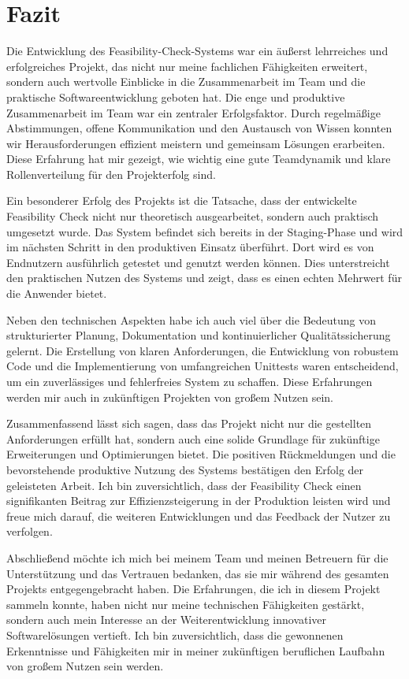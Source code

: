 \chapter{Fazit}

Die Entwicklung des Feasibility-Check-Systems war ein äußerst lehrreiches und erfolgreiches Projekt, das nicht nur meine fachlichen Fähigkeiten erweitert, sondern auch wertvolle Einblicke in die Zusammenarbeit im Team und die praktische Softwareentwicklung geboten hat. Die enge und produktive Zusammenarbeit im Team war ein zentraler Erfolgsfaktor. Durch regelmäßige Abstimmungen, offene Kommunikation und den Austausch von Wissen konnten wir Herausforderungen effizient meistern und gemeinsam Lösungen erarbeiten. Diese Erfahrung hat mir gezeigt, wie wichtig eine gute Teamdynamik und klare Rollenverteilung für den Projekterfolg sind.

Ein besonderer Erfolg des Projekts ist die Tatsache, dass der entwickelte Feasibility Check nicht nur theoretisch ausgearbeitet, sondern auch praktisch umgesetzt wurde. Das System befindet sich bereits in der Staging-Phase und wird im nächsten Schritt in den produktiven Einsatz überführt. Dort wird es von Endnutzern ausführlich getestet und genutzt werden können. Dies unterstreicht den praktischen Nutzen des Systems und zeigt, dass es einen echten Mehrwert für die Anwender bietet.

Neben den technischen Aspekten habe ich auch viel über die Bedeutung von strukturierter Planung, Dokumentation und kontinuierlicher Qualitätssicherung gelernt. Die Erstellung von klaren Anforderungen, die Entwicklung von robustem Code und die Implementierung von umfangreichen Unittests waren entscheidend, um ein zuverlässiges und fehlerfreies System zu schaffen. Diese Erfahrungen werden mir auch in zukünftigen Projekten von großem Nutzen sein.

Zusammenfassend lässt sich sagen, dass das Projekt nicht nur die gestellten Anforderungen erfüllt hat, sondern auch eine solide Grundlage für zukünftige Erweiterungen und Optimierungen bietet. Die positiven Rückmeldungen und die bevorstehende produktive Nutzung des Systems bestätigen den Erfolg der geleisteten Arbeit. Ich bin zuversichtlich, dass der Feasibility Check einen signifikanten Beitrag zur Effizienzsteigerung in der Produktion leisten wird und freue mich darauf, die weiteren Entwicklungen und das Feedback der Nutzer zu verfolgen.

Abschließend möchte ich mich bei meinem Team und meinen Betreuern für die Unterstützung und das Vertrauen bedanken, das sie mir während des gesamten Projekts entgegengebracht haben. Die Erfahrungen, die ich in diesem Projekt sammeln konnte, haben nicht nur meine technischen Fähigkeiten gestärkt, sondern auch mein Interesse an der Weiterentwicklung innovativer Softwarelösungen vertieft. Ich bin zuversichtlich, dass die gewonnenen Erkenntnisse und Fähigkeiten mir in meiner zukünftigen beruflichen Laufbahn von großem Nutzen sein werden.




